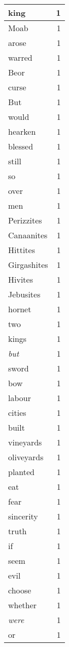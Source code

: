 \begin{center}
\begin{longtable}{l|r}
king & 1\\ \hline 
Moab & 1\\ \hline 
arose & 1\\ \hline 
warred & 1\\ \hline 
Beor & 1\\ \hline 
curse & 1\\ \hline 
But & 1\\ \hline 
would & 1\\ \hline 
hearken & 1\\ \hline 
blessed & 1\\ \hline 
still & 1\\ \hline 
so & 1\\ \hline 
over & 1\\ \hline 
men & 1\\ \hline 
Perizzites & 1\\ \hline 
Canaanites & 1\\ \hline 
Hittites & 1\\ \hline 
Girgashites & 1\\ \hline 
Hivites & 1\\ \hline 
Jebusites & 1\\ \hline 
hornet & 1\\ \hline 
two & 1\\ \hline 
kings & 1\\ \hline 
\emph{but} & 1\\ \hline 
sword & 1\\ \hline 
bow & 1\\ \hline 
labour & 1\\ \hline 
cities & 1\\ \hline 
built & 1\\ \hline 
vineyards & 1\\ \hline 
oliveyards & 1\\ \hline 
planted & 1\\ \hline 
eat & 1\\ \hline 
fear & 1\\ \hline 
sincerity & 1\\ \hline 
truth & 1\\ \hline 
if & 1\\ \hline 
seem & 1\\ \hline 
evil & 1\\ \hline 
choose & 1\\ \hline 
whether & 1\\ \hline 
\emph{were} & 1\\ \hline 
or & 1\\ \hline 

\end{longtable}
\end{center}
